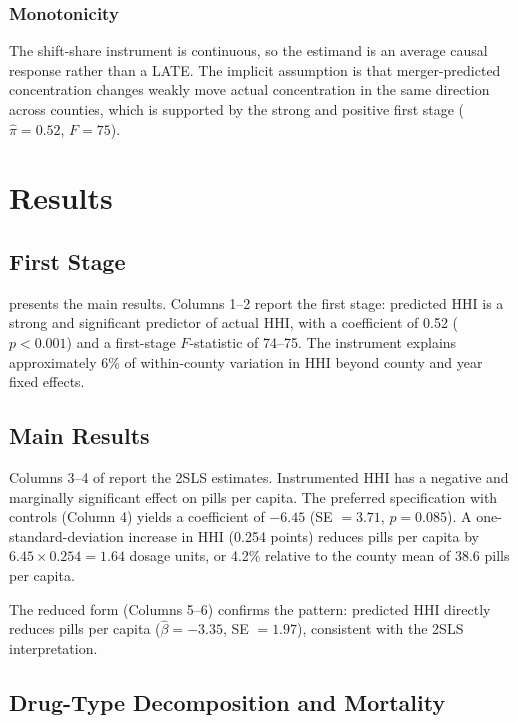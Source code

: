 \documentclass[12pt]{article}
\begin{document}
\subsubsection*{Monotonicity} The shift-share instrument is continuous, so the estimand is an average causal response rather than a LATE. The implicit assumption is that merger-predicted concentration changes weakly move actual concentration in the same direction across counties, which is supported by the strong and positive first stage ($\hat{\pi} = 0.52$, $F = 75$).

\section{Results}
\label{sec:results}

\subsection{First Stage}

 presents the main results. Columns 1--2 report the first stage: predicted HHI is a strong and significant predictor of actual HHI, with a coefficient of 0.52 ($p < 0.001$) and a first-stage $F$-statistic of 74--75. The instrument explains approximately 6\% of within-county variation in HHI beyond county and year fixed effects.

\subsection{Main Results}

Columns 3--4 of  report the 2SLS estimates. Instrumented HHI has a negative and marginally significant effect on pills per capita. The preferred specification with controls (Column 4) yields a coefficient of $-6.45$ (SE $= 3.71$, $p = 0.085$). A one-standard-deviation increase in HHI (0.254 points) reduces pills per capita by $6.45 \times 0.254 = 1.64$ dosage units, or 4.2\% relative to the county mean of 38.6 pills per capita.

The reduced form (Columns 5--6) confirms the pattern: predicted HHI directly reduces pills per capita ($\hat{\beta} = -3.35$, SE $= 1.97$), consistent with the 2SLS interpretation.



\subsection{Drug-Type Decomposition and Mortality}
\end{document}
